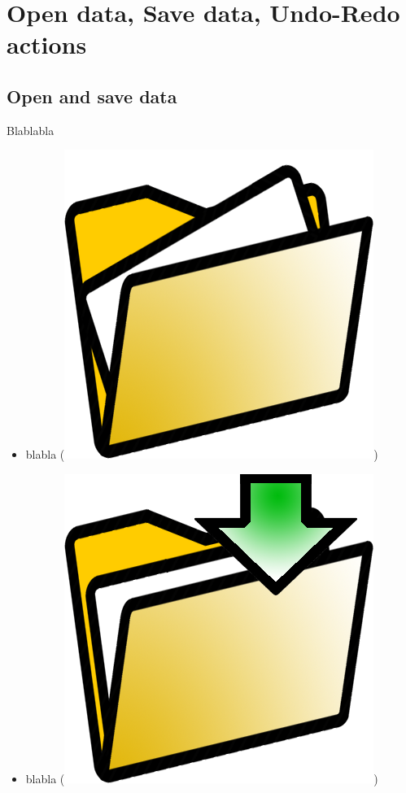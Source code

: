 \chapter{Open data, Save data, Undo-Redo actions}
\minitoc  

 \section{Open and save data}

Blablabla

\begin{itemize}
\item blabla (\includegraphics[scale=0.5]{images/03/open_data.png})
\item blabla (\includegraphics[scale=0.5]{images/03/save_data.png})
\end{itemize}





